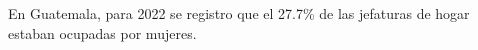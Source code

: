 En Guatemala, para 2022 se registro que el 27.7\% de las jefaturas de hogar estaban ocupadas por mujeres.